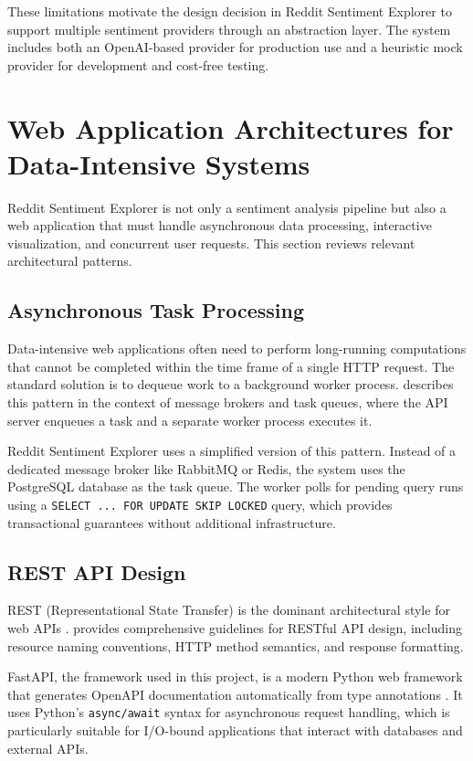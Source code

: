These limitations motivate the design decision in Reddit Sentiment Explorer to support multiple sentiment providers through an abstraction layer. The system includes both an OpenAI-based provider for production use and a heuristic mock provider for development and cost-free testing.

\section{Web Application Architectures for Data-Intensive Systems}
\label{sec:web_architectures}

Reddit Sentiment Explorer is not only a sentiment analysis pipeline but also a web application that must handle asynchronous data processing, interactive visualization, and concurrent user requests. This section reviews relevant architectural patterns.

\subsection{Asynchronous Task Processing}

Data-intensive web applications often need to perform long-running computations that cannot be completed within the time frame of a single HTTP request. The standard solution is to dequeue work to a background worker process.  describes this pattern in the context of message brokers and task queues, where the API server enqueues a task and a separate worker process executes it.

Reddit Sentiment Explorer uses a simplified version of this pattern. Instead of a dedicated message broker like RabbitMQ or Redis, the system uses the PostgreSQL database as the task queue. The worker polls for pending query runs using a \texttt{SELECT ... FOR UPDATE SKIP LOCKED} query, which provides transactional guarantees without additional infrastructure.

\subsection{REST API Design}

REST (Representational State Transfer) is the dominant architectural style for web APIs \cite{fielding2000architectural}.  provides comprehensive guidelines for RESTful API design, including resource naming conventions, HTTP method semantics, and response formatting.

FastAPI, the framework used in this project, is a modern Python web framework that generates OpenAPI documentation automatically from type annotations \cite{ramirez2018fastapi}. It uses Python's \texttt{async/await} syntax for asynchronous request handling, which is particularly suitable for I/O-bound applications that interact with databases and external APIs.

